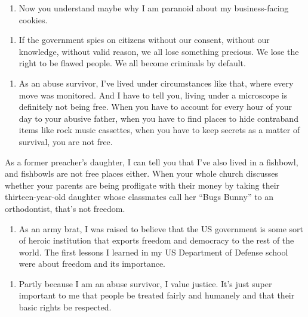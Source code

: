 \begin{enumerate}
\def\labelenumi{\arabic{enumi}.}
\setcounter{enumi}{7}
\tightlist
\item
  Now you understand maybe why I am paranoid about my business-facing
  cookies.
\end{enumerate}

\begin{enumerate}
\def\labelenumi{\arabic{enumi}.}
\setcounter{enumi}{8}
\tightlist
\item
  If the government spies on citizens without our consent, without our
  knowledge, without valid reason, we all lose something precious. We
  lose the right to be flawed people. We all become criminals by
  default.
\end{enumerate}

\begin{enumerate}
\def\labelenumi{\arabic{enumi}.}
\setcounter{enumi}{9}
\tightlist
\item
  As an abuse survivor, I've lived under circumstances like that, where
  every move was monitored. And I have to tell you, living under a
  microscope is definitely not being free. When you have to account for
  every hour of your day to your abusive father, when you have to find
  places to hide contraband items like rock music cassettes, when you
  have to keep secrets as a matter of survival, you are not free.
\end{enumerate}

As a former preacher's daughter, I can tell you that I've also lived in
a fishbowl, and fishbowls are not free places either. When your whole
church discusses whether your parents are being profligate with their
money by taking their thirteen-year-old daughter whose classmates call
her ``Bugs Bunny'' to an orthodontist, that's not freedom.

\begin{enumerate}
\def\labelenumi{\arabic{enumi}.}
\setcounter{enumi}{10}
\tightlist
\item
  As an army brat, I was raised to believe that the US government is
  some sort of heroic institution that exports freedom and democracy to
  the rest of the world. The first lessons I learned in my US Department
  of Defense school were about freedom and its importance.
\end{enumerate}

\begin{enumerate}
\def\labelenumi{\arabic{enumi}.}
\setcounter{enumi}{11}
\tightlist
\item
  Partly because I am an abuse survivor, I value justice. It's just
  super important to me that people be treated fairly and humanely and
  that their basic rights be respected.
\end{enumerate}

